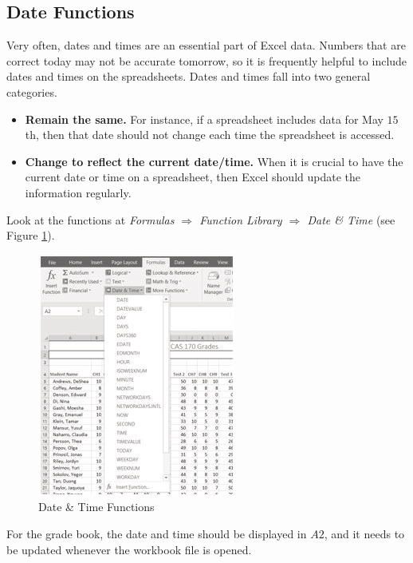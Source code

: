 \subsection{Date Functions}

Very often, dates and times are an essential part of Excel data. Numbers that are correct today may not be accurate tomorrow, so it is frequently helpful to include dates and times on the spreadsheets. Dates and times fall into two general categories.

\begin{itemize}
	\item \textbf{Remain the same.} For instance, if a spreadsheet includes data for May $ 15 $th, then that date should not change each time the spreadsheet is accessed.
	\item \textbf{Change to reflect the current date/time.} When it is crucial to have the current date or time on a spreadsheet, then Excel should update the information regularly.
\end{itemize}

Look at the functions at \textit{Formulas $ \Rightarrow $ Function Library $ \Rightarrow $ Date \& Time} (see Figure \ref{03:fig16}).

\begin{figure}[H]
	\centering
	\includegraphics[width=\maxwidth{.95\linewidth}]{gfx/ch03_fig16}
	\caption{Date \& Time Functions}
	\label{03:fig16}
\end{figure}

For the grade book, the date and time should be displayed in $ A2 $, and it needs to be updated whenever the workbook file is opened.

